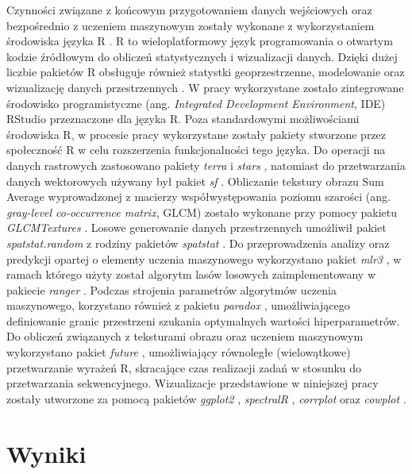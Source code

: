 \documentclass{amuthesis}
\begin{document}
Czynności związane z końcowym przygotowaniem danych wejściowych oraz
bezpośrednio z uczeniem maszynowym zostały wykonane z wykorzystaniem
środowiska języka R \autocite{R-base}. R to wieloplatformowy język
programowania o otwartym kodzie źródłowym do obliczeń statystycznych i
wizualizacji danych. Dzięki dużej liczbie pakietów R obsługuje również
statystki geoprzestrzenne, modelowanie oraz wizualizację danych
przestrzennych \autocite{lovelace_2019_geocomputation}. W pracy
wykorzystane zostało zintegrowane środowisko programistyczne (ang.
\emph{Integrated Development Environment}, IDE) RStudio
\autocite{rstudio_team_2020_rstudio} przeznaczone dla języka R. Poza
standardowymi możliwościami środowiska R, w procesie pracy wykorzystane
zostały pakiety stworzone przez społeczność R w celu rozszerzenia
funkcjonalności tego języka. Do operacji na danych rastrowych
zastosowano pakiety \emph{terra} \autocite{R-terra} i \emph{stars}
\autocite{R-stars}, natomiast do przetwarzania danych wektorowych
używany był pakiet \emph{sf} \autocite{R-sf}. Obliczanie tekstury obrazu
Sum Average wyprowadzonej z macierzy współwystępowania poziomu szarości
(ang. \emph{gray-level co-occurrence matrix}, GLCM) zostało wykonane
przy pomocy pakietu \emph{GLCMTextures} \autocite{R-GLCMTextures}.
Losowe generowanie danych przestrzennych umożliwił pakiet
\emph{spatstat.random} \autocite{R-spatstat.random} z rodziny pakietów
\emph{spatstat} \autocite{R-spatstat}. Do przeprowadzenia analizy oraz
predykcji opartej o elementy uczenia maszynowego wykorzystano pakiet
\emph{mlr3} \autocite{R-mlr3}, w ramach którego użyty został algorytm
lasów losowych zaimplementowany w pakiecie \emph{ranger}
\autocite{R-ranger}. Podczas strojenia parametrów algorytmów uczenia
maszynowego, korzystano również z pakietu \emph{paradox}
\autocite{R-paradox}, umożliwiającego definiowanie granic przestrzeni
szukania optymalnych wartości hiperparametrów. Do obliczeń związanych z
teksturami obrazu oraz uczeniem maszynowym wykorzystano pakiet
\emph{future} \autocite{R-future}, umożliwiający równoległe
(wielowątkowe) przetwarzanie wyrażeń R, skracające czas realizacji zadań
w stosunku do przetwarzania sekwencyjnego. Wizualizacje przedstawione w
niniejszej pracy zostały utworzone za pomocą pakietów \emph{ggplot2}
\autocite{R-ggplot2}, \emph{spectralR} \autocite{R-spectralR},
\emph{corrplot} \autocite{R-corrplot} oraz \emph{cowplot}
\autocite{R-cowplot}.


\hypertarget{sec-wyniki}{%
\chapter{Wyniki}\label{sec-wyniki}}
\end{document}
